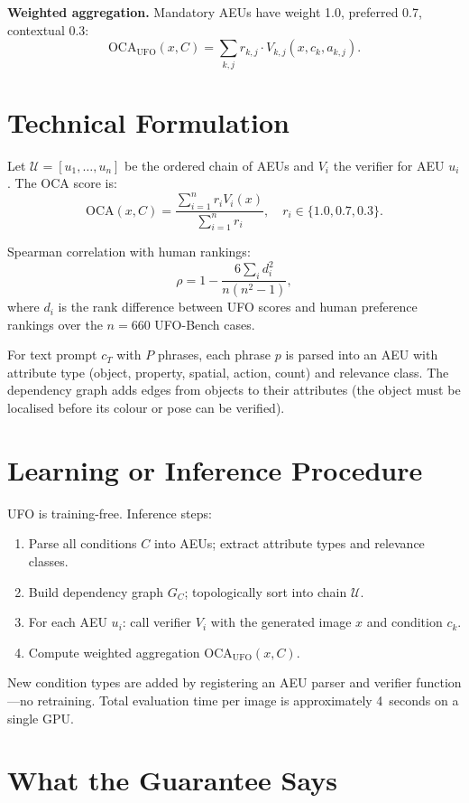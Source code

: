 \documentclass[10pt,twocolumn]{article}
\begin{document}
\textbf{Weighted aggregation.} Mandatory AEUs have weight 1.0,
preferred 0.7, contextual 0.3:
\[
\text{OCA}_{\text{UFO}}(x,C) = \sum_{k,j} r_{k,j}\cdot V_{k,j}(x, c_k, a_{k,j}).
\]

\section{Technical Formulation}

Let $\mathcal{U} = [u_1, \ldots, u_n]$ be the ordered chain of AEUs
and $V_i$ the verifier for AEU $u_i$. The OCA score is:
\[
\text{OCA}(x,C) = \frac{\sum_{i=1}^n r_i V_i(x)}{\sum_{i=1}^n r_i},
\quad r_i \in \{1.0, 0.7, 0.3\}.
\]

Spearman correlation with human rankings:
\[
\rho = 1 - \frac{6\sum_i d_i^2}{n(n^2-1)},
\]
where $d_i$ is the rank difference between UFO scores and human
preference rankings over the $n=660$ UFO-Bench cases.

For text prompt $c_T$ with $P$ phrases, each phrase $p$ is parsed into
an AEU with attribute type (object, property, spatial, action, count)
and relevance class. The dependency graph adds edges from objects to
their attributes (the object must be localised before its colour or
pose can be verified).

\section{Learning or Inference Procedure}

UFO is training-free. Inference steps:

\begin{enumerate}[itemsep=2pt,parsep=0pt]
  \item Parse all conditions $C$ into AEUs; extract attribute types and
    relevance classes.
  \item Build dependency graph $G_C$; topologically sort into chain $\mathcal{U}$.
  \item For each AEU $u_i$: call verifier $V_i$ with the generated image
    $x$ and condition $c_k$.
  \item Compute weighted aggregation $\text{OCA}_{\text{UFO}}(x,C)$.
\end{enumerate}

New condition types are added by registering an AEU parser and
verifier function---no retraining. Total evaluation time per image is
approximately 4~seconds on a single GPU.

\section{What the Guarantee Says}
\end{document}
